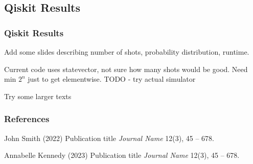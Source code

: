 \documentclass[
	11pt, %
]{beamer}
\begin{document}


\subsection{Qiskit Results}
\begin{frame}
    \frametitle{Qiskit Results}
    Add some slides describing number of shots, probability distribution, runtime.

    \bigskip
    Current code uses statevector, not sure how many shots would be good. Need min $2^n$ just to get elementwise. TODO - try actual simulator
    
    \bigskip
    Try some larger texts
\end{frame}


\begin{frame} %
    \frametitle{References}

    \begin{thebibliography}{99} %
        \footnotesize %

        John Smith (2022)
        \newblock Publication title
        \newblock \emph{Journal Name} 12(3), 45 -- 678.

        Annabelle Kennedy (2023)
        \newblock Publication title
        \newblock \emph{Journal Name} 12(3), 45 -- 678.
    \end{thebibliography}
\end{frame}
\end{document}
